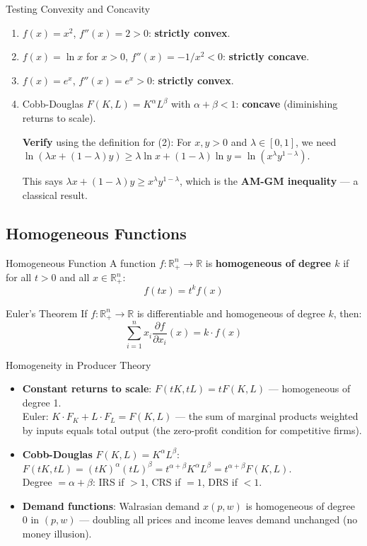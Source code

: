 \documentclass[12pt, a4paper]{article}
\theoremstyle{definition}
\newcommand{\R}{\mathbb{R}}
\begin{document}
\begin{exbox}{Testing Convexity and Concavity}
\begin{enumerate}
  \item $f(x) = x^2$, $f''(x) = 2 > 0$: \textbf{strictly convex}.
  \item $f(x) = \ln x$ for $x > 0$, $f''(x) = -1/x^2 < 0$: \textbf{strictly concave}.
  \item $f(x) = e^x$, $f''(x) = e^x > 0$: \textbf{strictly convex}.
  \item Cobb-Douglas $F(K,L) = K^\alpha L^\beta$ with $\alpha+\beta < 1$: \textbf{concave} (diminishing returns to scale).

  \textbf{Verify} using the definition for (2): For $x, y > 0$ and $\lambda \in [0,1]$, we need $\ln(\lambda x + (1-\lambda)y) \geq \lambda\ln x + (1-\lambda)\ln y = \ln(x^\lambda y^{1-\lambda})$.

  This says $\lambda x + (1-\lambda)y \geq x^\lambda y^{1-\lambda}$, which is the \textbf{AM-GM inequality} --- a classical result. \checkmark
\end{enumerate}
\end{exbox}

\subsection{Homogeneous Functions}

\begin{defbox}{Homogeneous Function}
A function $f: \R^n_+ \to \R$ is \textbf{homogeneous of degree $k$} if for all $t > 0$ and all $x \in \R^n_+$:
\[
  f(tx) = t^k f(x)
\]
\end{defbox}

\begin{thmbox}{Euler's Theorem}
If $f: \R^n_+ \to \R$ is differentiable and homogeneous of degree $k$, then:
\[
  \sum_{i=1}^n x_i \frac{\partial f}{\partial x_i}(x) = k \cdot f(x)
\]
\end{thmbox}

\begin{exbox}{Homogeneity in Producer Theory}
\begin{itemize}
  \item \textbf{Constant returns to scale}: $F(tK, tL) = tF(K,L)$ --- homogeneous of degree 1.\\
    Euler: $K \cdot F_K + L \cdot F_L = F(K,L)$ --- the sum of marginal products weighted by inputs equals total output (the zero-profit condition for competitive firms).
  \item \textbf{Cobb-Douglas} $F(K,L) = K^\alpha L^\beta$:
    $F(tK,tL) = (tK)^\alpha(tL)^\beta = t^{\alpha+\beta}K^\alpha L^\beta = t^{\alpha+\beta}F(K,L)$.\\
    Degree $= \alpha+\beta$: IRS if $>1$, CRS if $= 1$, DRS if $<1$.
  \item \textbf{Demand functions}: Walrasian demand $x(p,w)$ is homogeneous of degree 0 in $(p,w)$ --- doubling all prices and income leaves demand unchanged (no money illusion).
\end{itemize}
\end{exbox}
\end{document}
